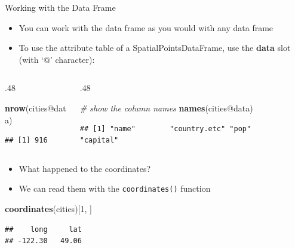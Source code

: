 \documentclass[10pt,ignorenonframetext,]{beamer}
\newenvironment{Shaded}{\begin{snugshade}}{\end{snugshade}}
\newcommand{\KeywordTok}[1]{\textcolor[rgb]{0.13,0.29,0.53}{\textbf{{#1}}}}
\newcommand{\DecValTok}[1]{\textcolor[rgb]{0.00,0.00,0.81}{{#1}}}
\newcommand{\CommentTok}[1]{\textcolor[rgb]{0.56,0.35,0.01}{\textit{{#1}}}}
\newcommand{\NormalTok}[1]{{#1}}
\providecommand{\tightlist}{%
  \setlength{\itemsep}{0pt}\setlength{\parskip}{0pt}}
\def\begincols{\begin{columns}}
\def\begincol{\begin{column}}
\def\endcol{\end{column}}
\def\endcols{\end{columns}}
\begin{document}
\begin{frame}[fragile]{Working with the Data Frame}

\begin{itemize}
\tightlist
\item
  You can work with the data frame as you would with any data frame
\item
  To use the attribute table of a SpatialPointsDataFrame, use the
  \textbf{data} slot (with `@' character):
\end{itemize}

\begincols
\begincol{.48\textwidth}

\begin{Shaded}
\begin{Highlighting}[]
\KeywordTok{nrow}\NormalTok{(cities@data)}
\end{Highlighting}
\end{Shaded}

\begin{verbatim}
## [1] 916
\end{verbatim}

\endcol
\begincol{.48\textwidth}

\begin{Shaded}
\begin{Highlighting}[]
\CommentTok{# show the column names}
\KeywordTok{names}\NormalTok{(cities@data)}
\end{Highlighting}
\end{Shaded}

\begin{verbatim}
## [1] "name"        "country.etc" "pop"         "capital"
\end{verbatim}

\endcol
\endcols

\begin{itemize}
\tightlist
\item
  What happened to the coordinates?
\item
  We can read them with the \texttt{coordinates()} function
\end{itemize}

\begin{Shaded}
\begin{Highlighting}[]
\KeywordTok{coordinates}\NormalTok{(cities)[}\DecValTok{1}\NormalTok{, ]}
\end{Highlighting}
\end{Shaded}

\begin{verbatim}
##    long     lat 
## -122.30   49.06
\end{verbatim}

\end{frame}
\end{document}
